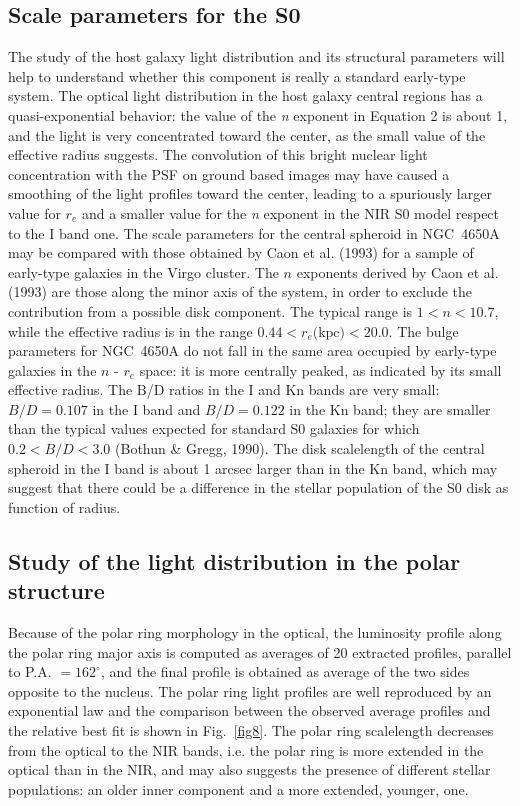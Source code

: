 \documentclass[preprint]{aastex}
\begin{document}
\subsection{Scale parameters for the S0}
\label{params0}
The study of the host galaxy light distribution and its structural parameters
will help to understand whether this component is really a standard
early-type system. 
The optical light distribution in the host galaxy central regions has a 
quasi-exponential behavior: 
the value of the {\it n} exponent in Equation 2 is about 1, and 
the light is very concentrated toward the center, 
as the small value of the effective radius suggests. 
The convolution of this bright nuclear light concentration with the
PSF on ground based images may have caused a smoothing of the light
profiles toward the center, leading to a spuriously larger value for  $r_{e}$ 
and a smaller value for the {\it n} exponent in the NIR S0 model respect to the
I band one. 
The scale parameters for the central spheroid in NGC~4650A   
may be compared with those obtained by Caon et al. (1993) for a sample
of early-type galaxies in the Virgo cluster.  The $n$ exponents derived
by Caon et al. (1993) are those along the minor axis of the system, 
in order to exclude the contribution  from a possible disk component.
The typical range is $1 < n < 10.7$, while the
effective radius is in the range $0.44 < r_{e} \mbox{(kpc)} < 20.0$.
The bulge parameters for NGC~4650A
do not fall in the same area occupied by early-type galaxies in 
the $n$ - $r_{e}$ space: it is more centrally peaked, as indicated by
its small effective radius.
The B/D ratios in the I and Kn bands are very small: $B/D=0.107$ in the I band 
and $B/D=0.122$ in the Kn band; 
they are smaller than the typical values expected for
standard S0 galaxies for which $0.2 < B/D < 3.0$ (Bothun \& Gregg, 1990). 
The disk scalelength of the central spheroid in the I band 
is about 1 arcsec larger than in the Kn band,
which may suggest that there could be a difference in the
stellar population of the S0 disk as function of radius.

\subsection{Study of the light distribution in the polar structure}\label{parampr}
Because of the polar ring morphology in the optical, the luminosity profile
along the polar ring major axis is computed as averages of 20
extracted profiles, parallel to P.A. $= 162^\circ$, and
the final profile is obtained as average of the two sides
opposite to the nucleus.
The polar ring light profiles are well reproduced by an exponential law and
the comparison between the observed average profiles and the relative best
fit is shown in Fig.~\ref{fig8}. The polar ring scalelength 
decreases from the optical to the NIR bands, i.e. the polar ring is
more extended in the optical than in the NIR, and
may also suggests the presence of different stellar
populations: an older inner component and
a more extended, younger, one.
\end{document}

